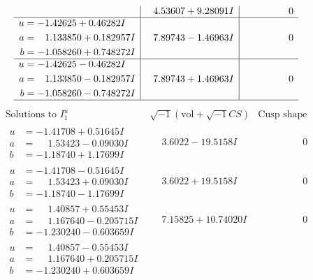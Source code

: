 \documentclass[1p]{elsarticle_modified}
\theoremstyle{definition}
\newcommand{\I}{\sqrt{-1}}
\begin{document}
$$\begin{array}{c|c|c}
 & \phantom{-}4.53607 + 9.28091 I & \phantom{-0.000000 } 0 \\ \hline\begin{aligned}
u &= -1.42625 + 0.46282 I \\
a &= \phantom{-}1.133850 + 0.182957 I \\
b &= -1.058260 + 0.748272 I\end{aligned}
 & \phantom{-}7.89743 - 1.46963 I & \phantom{-0.000000 } 0 \\ \hline\begin{aligned}
u &= -1.42625 - 0.46282 I \\
a &= \phantom{-}1.133850 - 0.182957 I \\
b &= -1.058260 - 0.748272 I\end{aligned}
 & \phantom{-}7.89743 + 1.46963 I & \phantom{-0.000000 } 0\\
 \hline 
 \end{array}$$\newpage$$\begin{array}{c|c|c}  
\text{Solutions to }I^u_{1}& \I (\text{vol} + \sqrt{-1}CS) & \text{Cusp shape}\\
 \hline 
\begin{aligned}
u &= -1.41708 + 0.51645 I \\
a &= \phantom{-}1.53423 - 0.09030 I \\
b &= -1.18740 + 1.17699 I\end{aligned}
 & \phantom{-}3.6022 - 19.5158 I & \phantom{-0.000000 } 0 \\ \hline\begin{aligned}
u &= -1.41708 - 0.51645 I \\
a &= \phantom{-}1.53423 + 0.09030 I \\
b &= -1.18740 - 1.17699 I\end{aligned}
 & \phantom{-}3.6022 + 19.5158 I & \phantom{-0.000000 } 0 \\ \hline\begin{aligned}
u &= \phantom{-}1.40857 + 0.55453 I \\
a &= \phantom{-}1.167640 - 0.205715 I \\
b &= -1.230240 - 0.603659 I\end{aligned}
 & \phantom{-}7.15825 + 10.74020 I & \phantom{-0.000000 } 0 \\ \hline\begin{aligned}
u &= \phantom{-}1.40857 - 0.55453 I \\
a &= \phantom{-}1.167640 + 0.205715 I \\
b &= -1.230240 + 0.603659 I\end{aligned}

\end{array}$$
\end{document}
